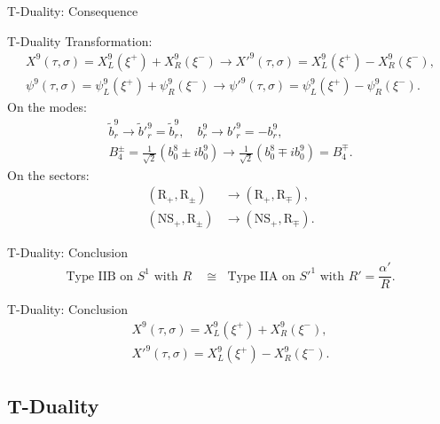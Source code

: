 \begin{frame}{T-Duality: Consequence}
	\begin{block}{T-Duality}
		Transformation:
		\vspace{-3mm}
		\begin{gather*}
			X^9(\tau, \sigma) = X^9_L(\xi^+) + X^9_R(\xi^-) \to X'^9(\tau,\sigma) = X^9_L(\xi^+) - X^9_R(\xi^-), \\
			\psi^9(\tau,\sigma) = \psi^9_L(\xi^+) + \psi^9_R(\xi^-) \to \psi'^9(\tau,\sigma) = \psi^9_L(\xi^+) - \psi^9_R(\xi^-).
		\end{gather*} \pause
		On the modes:
		\vspace{-3mm}
		\begin{gather*}
			\tilde{b}^9_r \to \tilde{b}'^9_r = \tilde{b}^9_r, \quad b^9_r \to b'^9_r = - b^9_r, \\
			B^\pm_4 = \frac{1}{\sqrt{2}} \left( b^8_0 \pm i b^9_0 \right) \to \frac{1}{\sqrt{2}} \left( b^8_0 \mp i b^9_0 \right) = B^\mp_4.
		\end{gather*} \pause
		On the sectors:
		\vspace{-3mm}
		\begin{align*}
			(\text{R}_+, \text{R}_\pm) &\to (\text{R}_+, \text{R}_\mp), \\
    (\text{NS}_+, \text{R}_\pm) &\to (\text{NS}_+, \text{R}_\mp).
		\end{align*}
	\end{block}
\end{frame}

\begin{frame}{T-Duality: Conclusion}
	\begin{equation*}
		\text{Type IIB on $S^1$ with $R$ $\; \cong\;$ Type IIA on $S'^1$ with $R' = \frac{\alpha'}{R}$} .
  \end{equation*}
\end{frame}

\begin{frame}{T-Duality: Conclusion}
	\begin{gather*}
		X^9(\tau,\sigma) = X^9_L(\xi^+) + X^9_R(\xi^-) ,\\
		X'^9(\tau,\sigma) = X^9_L(\xi^+) - X^9_R(\xi^-) .
  \end{gather*}
\end{frame}

\subsection{T-Duality}